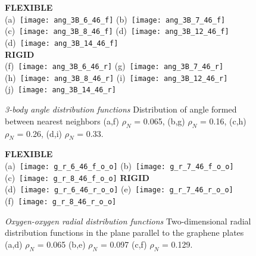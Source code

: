\documentclass[12pt]{article}
\begin{document}
\begin{figure}[h!]
	\centering
	\textbf{FLEXIBLE} \\
	(a)~\texttt{[image: ang\_3B\_6\_46\_f]} 
	(b)~\texttt{[image: ang\_3B\_7\_46\_f]}
	(c)~\texttt{[image: ang\_3B\_8\_46\_f]}
	(d)~\texttt{[image: ang\_3B\_12\_46\_f]}
	(d)~\texttt{[image: ang\_3B\_14\_46\_f]} \\
	\textbf{RIGID} \\
	(f)~\texttt{[image: ang\_3B\_6\_46\_r]} 
	(g)~\texttt{[image: ang\_3B\_7\_46\_r]}
	(h)~\texttt{[image: ang\_3B\_8\_46\_r]}
	(i)~\texttt{[image: ang\_3B\_12\_46\_r]}
	(j)~\texttt{[image: ang\_3B\_14\_46\_r]}
	\vspace{-10pt}
	\caption{\textit{3-body angle distribution functions} Distribution of angle formed between nearest neighbors (a,f) \(\rho_N\) = 0.065, (b,g) \(\rho_N\) = 0.16, (c,h) \(\rho_N\) = 0.26, (d,i) \(\rho_N\) = 0.33.}
	\label{fig:3body_angle_dist}
\end{figure}

\begin{figure}[h!]
	\centering
	\textbf{FLEXIBLE} \\
	(a)~\texttt{[image: g\_r\_6\_46\_f\_o\_o]} 
	(b)~\texttt{[image: g\_r\_7\_46\_f\_o\_o]}
	(c)~\texttt{[image: g\_r\_8\_46\_f\_o\_o]}
	\textbf{RIGID} \\
	(d)~\texttt{[image: g\_r\_6\_46\_r\_o\_o]} 
	(e)~\texttt{[image: g\_r\_7\_46\_r\_o\_o]}
	 (f)~\texttt{[image: g\_r\_8\_46\_r\_o\_o]}
	\vspace{-10pt}
	\caption{\textit{Oxygen-oxygen radial distribution functions} Two-dimensional radial distribution functions in the plane parallel to the graphene plates (a,d) \(\rho_N\) = 0.065 (b,e) \(\rho_N\) = 0.097 (c,f) \(\rho_N\) = 0.129.}
	\label{fig:gr}
\end{figure}

\clearpage
\printbibliography
\end{document}
